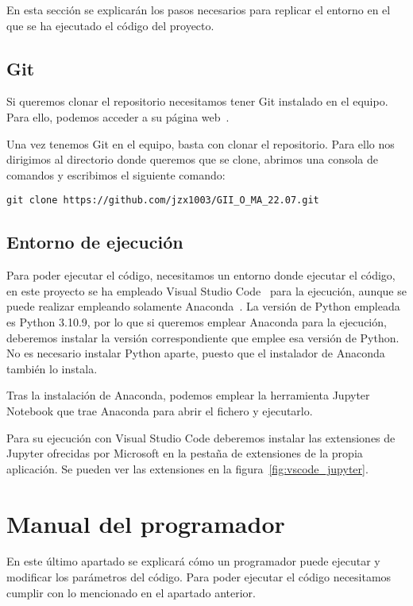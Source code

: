 En esta sección se explicarán los pasos necesarios para replicar el entorno en el que se ha ejecutado el código del proyecto.

\subsection{Git}

Si queremos clonar el repositorio necesitamos tener Git instalado en el equipo. Para ello, podemos acceder a su página web~\cite{git}.

Una vez tenemos Git en el equipo, basta con clonar el repositorio. Para ello nos dirigimos al directorio donde queremos que se clone, abrimos una consola de comandos y escribimos el siguiente comando:

\texttt{git clone https://github.com/jzx1003/GII\_O\_MA\_22.07.git}

\subsection{Entorno de ejecución}

Para poder ejecutar el código, necesitamos un entorno donde ejecutar el código, en este proyecto se ha empleado Visual Studio Code~\cite{vscode} para la ejecución, aunque se puede realizar empleando solamente Anaconda~\cite{anaconda}. La versión de Python empleada es Python 3.10.9, por lo que si queremos emplear Anaconda para la ejecución, deberemos instalar la versión correspondiente que emplee esa versión de Python. No es necesario instalar Python aparte, puesto que el instalador de Anaconda también lo instala.

Tras la instalación de Anaconda, podemos emplear la herramienta Jupyter Notebook que trae Anaconda para abrir el fichero y ejecutarlo. 

Para su ejecución con Visual Studio Code deberemos instalar las extensiones de Jupyter ofrecidas por Microsoft en la pestaña de extensiones de la propia aplicación. Se pueden ver las extensiones en la figura~\ref{fig:vscode_jupyter}.


\section{Manual del programador}

En este último apartado se explicará cómo un programador puede ejecutar y modificar los parámetros del código. Para poder ejecutar el código necesitamos cumplir con lo mencionado en el apartado anterior.

